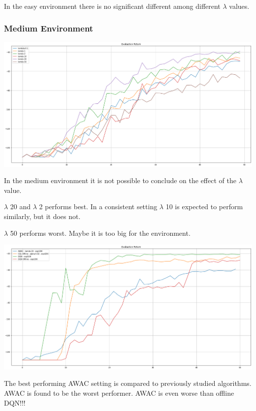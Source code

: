 \documentclass[11pt]{article}
\begin{document}
    In the easy environment there is no significant different among different $\lambda$ values.

    \subsubsection{Medium Environment}

    \hspace*{-0.3in}
    \includegraphics[scale=0.30]{q4/eval-medium-unsupervised}

    In the medium environment it is not possible to conclude on the effect of the $ \lambda $ value.

    $\lambda$ 20 and $\lambda$ 2 performs best.
    In a consistent setting $\lambda$ 10 is expected to perform similarly, but it does not.

    $\lambda$ 50 performs worst.
    Maybe it is too big for the environment.

    \hspace*{-0.3in}
    \includegraphics[scale=0.30]{q4/eval-medium-unsupervised-compared}

    The best performing AWAC setting is compared to previously studied algorithms.
    AWAC is found to be the worst performer.
    AWAC is even worse than offline DQN!!!
\end{document}
